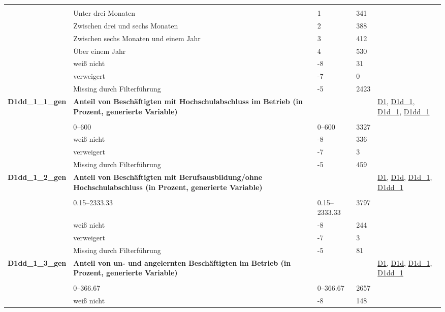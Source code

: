 \begin{longtable}{| L{2.5cm} | L{8.25cm}| C{1.5cm} | R{1.25cm} | C{2.25cm} |  }
   &  &  &  &  \\ 
   & Unter drei Monaten & 1 & 341 &  \\ 
   & Zwischen drei und sechs Monaten & 2 & 388 &  \\ 
   & Zwischen sechs Monaten und einem Jahr & 3 & 412 &  \\ 
   & Über einem Jahr & 4 & 530 &  \\ 
   & weiß nicht & -8 & 31 &  \\ 
   & verweigert & -7 & 0 &  \\ 
   & Missing durch Filterführung & -5 & 2423 &  \\ 
   \midrule
\textbf{D1dd\_1\_1\_gen}\label{var:suf:D1dd:1:1:gen} & \textbf{Anteil von Beschäftigten mit Hochschulabschluss im Betrieb (in Prozent, generierte Variable)} &  &  & \hyperref[D1]{D1}, \hyperref[D1d:1]{D1d\_1}, \hyperref[D1d:1]{D1d\_1}, \hyperref[D1dd:1]{D1dd\_1} \\ 
   &  &  &  &  \\ 
   & 0--600 & 0--600 & 3327 &  \\ 
   & weiß nicht & -8 & 336 &  \\ 
   & verweigert & -7 & 3 &  \\ 
   & Missing durch Filterführung & -5 & 459 &  \\ 
   \midrule
\textbf{D1dd\_1\_2\_gen}\label{var:suf:D1dd:1:2:gen} & \textbf{Anteil von Beschäftigten mit Berufsausbildung/ohne Hochschulabschluss (in Prozent, generierte Variable)} &  &  & \hyperref[D1]{D1}, \hyperref[D1d]{D1d}, \hyperref[D1d:1]{D1d\_1}, \hyperref[D1dd:1]{D1dd\_1} \\ 
   &  &  &  &  \\ 
   & 0.15--2333.33 & 0.15--2333.33 & 3797 &  \\ 
   & weiß nicht & -8 & 244 &  \\ 
   & verweigert & -7 & 3 &  \\ 
   & Missing durch Filterführung & -5 & 81 &  \\ 
   \midrule
\textbf{D1dd\_1\_3\_gen}\label{var:suf:D1dd:1:3:gen} & \textbf{Anteil von un- und angelernten Beschäftigten im Betrieb (in Prozent, generierte Variable)} &  &  & \hyperref[D1]{D1}, \hyperref[D1d]{D1d}, \hyperref[D1d:1]{D1d\_1}, \hyperref[D1dd:1]{D1dd\_1} \\ 
   &  &  &  &  \\ 
   & 0--366.67 & 0--366.67 & 2657 &  \\ 
   & weiß nicht & -8 & 148 &  \\ 

\end{longtable}

